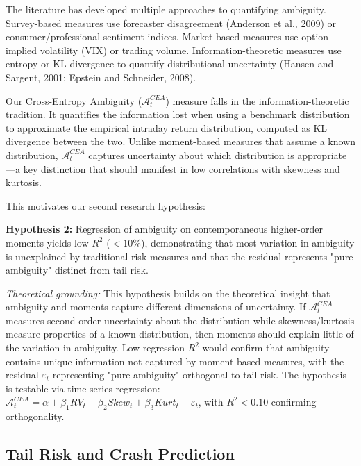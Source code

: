 \documentclass[preprint,12pt,authoryear]{elsarticle}
\begin{document}
The literature has developed multiple approaches to quantifying ambiguity. Survey-based measures use forecaster disagreement (Anderson et al., 2009) or consumer/professional sentiment indices. Market-based measures use option-implied volatility (VIX) or trading volume. Information-theoretic measures use entropy or KL divergence to quantify distributional uncertainty (Hansen and Sargent, 2001; Epstein and Schneider, 2008).

Our Cross-Entropy Ambiguity ($\mathcal{A}^{CEA}_t$) measure falls in the information-theoretic tradition. It quantifies the information lost when using a benchmark distribution to approximate the empirical intraday return distribution, computed as KL divergence between the two. Unlike moment-based measures that assume a known distribution, $\mathcal{A}^{CEA}_t$ captures uncertainty about which distribution is appropriate—a key distinction that should manifest in low correlations with skewness and kurtosis.

This motivates our second research hypothesis:

\begin{center}
\textbf{Hypothesis 2:} Regression of ambiguity on contemporaneous higher-order moments yields low $R^2$ ($<10\%$), demonstrating that most variation in ambiguity is unexplained by traditional risk measures and that the residual represents "pure ambiguity" distinct from tail risk.
\end{center}

\noindent
\textit{Theoretical grounding:} This hypothesis builds on the theoretical insight that ambiguity and moments capture different dimensions of uncertainty. If $\mathcal{A}^{CEA}_t$ measures second-order uncertainty about the distribution while skewness/kurtosis measure properties of a known distribution, then moments should explain little of the variation in ambiguity. Low regression $R^2$ would confirm that ambiguity contains unique information not captured by moment-based measures, with the residual $\varepsilon_t$ representing "pure ambiguity" orthogonal to tail risk. The hypothesis is testable via time-series regression: $\mathcal{A}^{CEA}_t = \alpha + \beta_1 RV_t + \beta_2 Skew_t + \beta_3 Kurt_t + \varepsilon_t$, with $R^2 < 0.10$ confirming orthogonality.

\subsection{Tail Risk and Crash Prediction}
\end{document}
